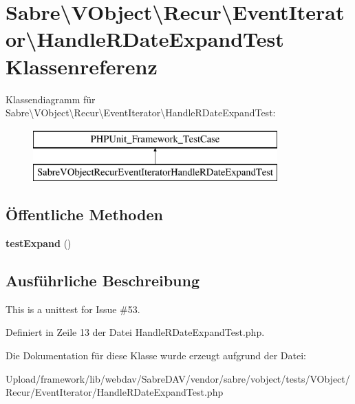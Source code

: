 \hypertarget{class_sabre_1_1_v_object_1_1_recur_1_1_event_iterator_1_1_handle_r_date_expand_test}{}\section{Sabre\textbackslash{}V\+Object\textbackslash{}Recur\textbackslash{}Event\+Iterator\textbackslash{}Handle\+R\+Date\+Expand\+Test Klassenreferenz}
\label{class_sabre_1_1_v_object_1_1_recur_1_1_event_iterator_1_1_handle_r_date_expand_test}
Klassendiagramm für Sabre\textbackslash{}V\+Object\textbackslash{}Recur\textbackslash{}Event\+Iterator\textbackslash{}Handle\+R\+Date\+Expand\+Test\+:\begin{figure}[H]
\begin{center}
\leavevmode
\includegraphics[height=2.000000cm]{class_sabre_1_1_v_object_1_1_recur_1_1_event_iterator_1_1_handle_r_date_expand_test}
\end{center}
\end{figure}
\subsection*{Öffentliche Methoden}
\begin{DoxyCompactItemize}
\item 
\mbox{\label{class_sabre_1_1_v_object_1_1_recur_1_1_event_iterator_1_1_handle_r_date_expand_test_a9e8844ea6a7239c4ae3425b70781f266}} 
{\bfseries test\+Expand} ()
\end{DoxyCompactItemize}


\subsection{Ausführliche Beschreibung}
This is a unittest for Issue \#53. 

Definiert in Zeile 13 der Datei Handle\+R\+Date\+Expand\+Test.\+php.



Die Dokumentation für diese Klasse wurde erzeugt aufgrund der Datei\+:\begin{DoxyCompactItemize}
\item 
Upload/framework/lib/webdav/\+Sabre\+D\+A\+V/vendor/sabre/vobject/tests/\+V\+Object/\+Recur/\+Event\+Iterator/Handle\+R\+Date\+Expand\+Test.\+php\end{DoxyCompactItemize}
